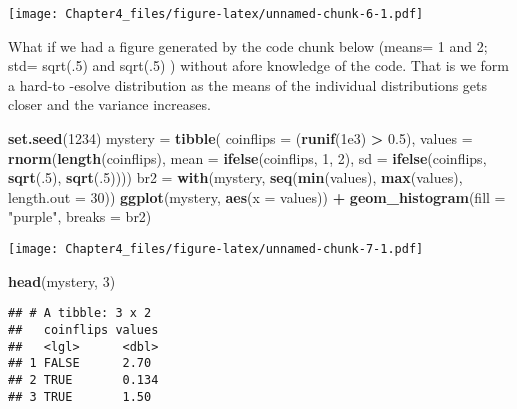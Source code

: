 \documentclass[]{article}
\newenvironment{Shaded}{\begin{snugshade}}{\end{snugshade}}
\newcommand{\DataTypeTok}[1]{\textcolor[rgb]{0.13,0.29,0.53}{#1}}
\newcommand{\DecValTok}[1]{\textcolor[rgb]{0.00,0.00,0.81}{#1}}
\newcommand{\FloatTok}[1]{\textcolor[rgb]{0.00,0.00,0.81}{#1}}
\newcommand{\KeywordTok}[1]{\textcolor[rgb]{0.13,0.29,0.53}{\textbf{#1}}}
\newcommand{\NormalTok}[1]{#1}
\newcommand{\OperatorTok}[1]{\textcolor[rgb]{0.81,0.36,0.00}{\textbf{#1}}}
\newcommand{\StringTok}[1]{\textcolor[rgb]{0.31,0.60,0.02}{#1}}
\begin{document}
\texttt{[image: Chapter4\_files/figure-latex/unnamed-chunk-6-1.pdf]}

What if we had a figure generated by the code chunk below (means= 1 and
2; std= sqrt(.5) and sqrt(.5) ) without afore knowledge of the code.
That is we form a hard-to -esolve distribution as the means of the
individual distributions gets closer and the variance increases.

\begin{Shaded}
\begin{Highlighting}[]
\KeywordTok{set.seed}\NormalTok{(}\DecValTok{1234}\NormalTok{)}
\NormalTok{mystery =}\StringTok{ }\KeywordTok{tibble}\NormalTok{(}
  \DataTypeTok{coinflips =}\NormalTok{ (}\KeywordTok{runif}\NormalTok{(}\FloatTok{1e3}\NormalTok{) }\OperatorTok{>}\StringTok{ }\FloatTok{0.5}\NormalTok{),}
  \DataTypeTok{values =} \KeywordTok{rnorm}\NormalTok{(}\KeywordTok{length}\NormalTok{(coinflips),}
               \DataTypeTok{mean =} \KeywordTok{ifelse}\NormalTok{(coinflips, }\DecValTok{1}\NormalTok{, }\DecValTok{2}\NormalTok{),}
               \DataTypeTok{sd   =} \KeywordTok{ifelse}\NormalTok{(coinflips, }\KeywordTok{sqrt}\NormalTok{(.}\DecValTok{5}\NormalTok{), }\KeywordTok{sqrt}\NormalTok{(.}\DecValTok{5}\NormalTok{))))}
\NormalTok{br2 =}\StringTok{ }\KeywordTok{with}\NormalTok{(mystery, }\KeywordTok{seq}\NormalTok{(}\KeywordTok{min}\NormalTok{(values), }\KeywordTok{max}\NormalTok{(values), }\DataTypeTok{length.out =} \DecValTok{30}\NormalTok{))}
\KeywordTok{ggplot}\NormalTok{(mystery, }\KeywordTok{aes}\NormalTok{(}\DataTypeTok{x =}\NormalTok{ values)) }\OperatorTok{+}
\KeywordTok{geom_histogram}\NormalTok{(}\DataTypeTok{fill =} \StringTok{"purple"}\NormalTok{, }\DataTypeTok{breaks =}\NormalTok{ br2)}
\end{Highlighting}
\end{Shaded}

\texttt{[image: Chapter4\_files/figure-latex/unnamed-chunk-7-1.pdf]}

\begin{Shaded}
\begin{Highlighting}[]
\KeywordTok{head}\NormalTok{(mystery, }\DecValTok{3}\NormalTok{)}
\end{Highlighting}
\end{Shaded}

\begin{verbatim}
## # A tibble: 3 x 2
##   coinflips values
##   <lgl>      <dbl>
## 1 FALSE      2.70 
## 2 TRUE       0.134
## 3 TRUE       1.50
\end{verbatim}
\end{document}
